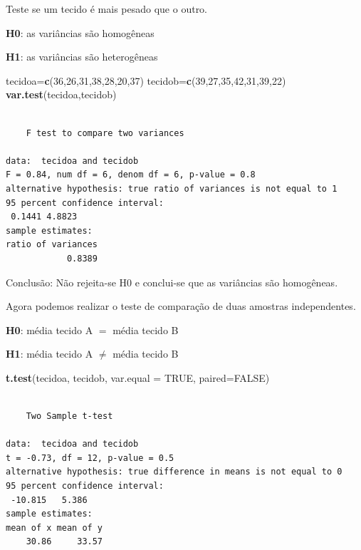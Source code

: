 \documentclass[12pt,brazil,oneside]{book}
\newenvironment{Shaded}{\begin{snugshade}}{\end{snugshade}}
\newcommand{\DataTypeTok}[1]{\textcolor[rgb]{0.13,0.29,0.53}{#1}}
\newcommand{\DecValTok}[1]{\textcolor[rgb]{0.00,0.00,0.81}{#1}}
\newcommand{\KeywordTok}[1]{\textcolor[rgb]{0.13,0.29,0.53}{\textbf{#1}}}
\newcommand{\NormalTok}[1]{#1}
\newcommand{\OtherTok}[1]{\textcolor[rgb]{0.56,0.35,0.01}{#1}}
\begin{document}
Teste se um tecido é mais pesado que o outro.

\textbf{H0}: as variâncias são homogêneas

\textbf{H1}: as variâncias são heterogêneas

\begin{Shaded}
\begin{Highlighting}[]
\NormalTok{tecidoa=}\KeywordTok{c}\NormalTok{(}\DecValTok{36}\NormalTok{,}\DecValTok{26}\NormalTok{,}\DecValTok{31}\NormalTok{,}\DecValTok{38}\NormalTok{,}\DecValTok{28}\NormalTok{,}\DecValTok{20}\NormalTok{,}\DecValTok{37}\NormalTok{)}
\NormalTok{tecidob=}\KeywordTok{c}\NormalTok{(}\DecValTok{39}\NormalTok{,}\DecValTok{27}\NormalTok{,}\DecValTok{35}\NormalTok{,}\DecValTok{42}\NormalTok{,}\DecValTok{31}\NormalTok{,}\DecValTok{39}\NormalTok{,}\DecValTok{22}\NormalTok{)}
\KeywordTok{var.test}\NormalTok{(tecidoa,tecidob)}
\end{Highlighting}
\end{Shaded}

\begin{verbatim}

    F test to compare two variances

data:  tecidoa and tecidob
F = 0.84, num df = 6, denom df = 6, p-value = 0.8
alternative hypothesis: true ratio of variances is not equal to 1
95 percent confidence interval:
 0.1441 4.8823
sample estimates:
ratio of variances 
            0.8389 
\end{verbatim}

Conclusão: Não rejeita-se H0 e conclui-se que as variâncias são
homogêneas.

Agora podemos realizar o teste de comparação de duas amostras
independentes.

\textbf{H0}: média tecido A \(=\) média tecido B

\textbf{H1}: média tecido A \(\neq\) média tecido B

\begin{Shaded}
\begin{Highlighting}[]
\KeywordTok{t.test}\NormalTok{(tecidoa, tecidob, }\DataTypeTok{var.equal =} \OtherTok{TRUE}\NormalTok{, }\DataTypeTok{paired=}\OtherTok{FALSE}\NormalTok{)}
\end{Highlighting}
\end{Shaded}

\begin{verbatim}

    Two Sample t-test

data:  tecidoa and tecidob
t = -0.73, df = 12, p-value = 0.5
alternative hypothesis: true difference in means is not equal to 0
95 percent confidence interval:
 -10.815   5.386
sample estimates:
mean of x mean of y 
    30.86     33.57 
\end{verbatim}
\end{document}
